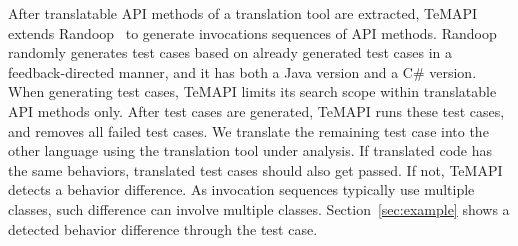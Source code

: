 After translatable API methods of a translation tool are extracted, TeMAPI extends Randoop~\cite{pacheco2007feedback} to generate invocations sequences of API methods. Randoop randomly generates test cases based on already generated test cases in a feedback-directed manner, and it has both a Java version and a C\# version. When generating test cases, TeMAPI limits its search scope within translatable API methods only. After test cases are generated, TeMAPI runs these test cases, and removes all failed test cases. We translate the remaining test case into the other language using the translation tool under analysis. If translated code has the same behaviors, translated test cases should also get passed. If not, TeMAPI detects a behavior difference. As invocation sequences typically use multiple classes, such difference can involve multiple classes. Section~\ref{sec:example} shows a detected behavior difference through the  test case.




